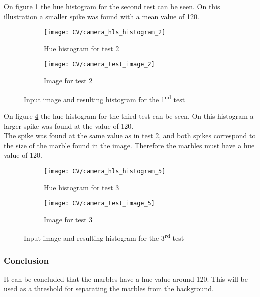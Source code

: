 \documentclass[../Head/Main.tex]{subfiles}
\begin{document}
On figure \ref{fig:hist_test_2} the hue histogram for the second test can be seen. On this illustration a smaller spike was found with a mean value of 120.
\begin{figure}[H]
	\centering
	\begin{subfigure}[b]{0.48\textwidth}
		\centering
		\texttt{[image: CV/camera\_hls\_histogram\_2]}
		\caption{Hue histogram for test 2}
		\label{fig:hist_test_2}
	\end{subfigure}
	\hfill
	\begin{subfigure}[b]{0.5\textwidth}
		\centering
		\texttt{[image: CV/camera\_test\_image\_2]}
		\caption{Image for test 2}
		\label{fig:image_test_2}
	\end{subfigure}
	\caption{Input image and resulting histogram for the 1\textsuperscript{nd} test}
	\label{fig:test_2}
\end{figure}

On figure \ref{fig:hist_test_3} the hue histogram for the third test can be seen. On this histogram a larger spike was found at the value of 120.\\
The spike was found at the same value as in test 2, and both spikes correspond to the size of the marble found in the image. Therefore the marbles must have a hue value of 120.
\begin{figure}[H]
	\centering
	\begin{subfigure}[b]{0.48\textwidth}
		\centering
		\texttt{[image: CV/camera\_hls\_histogram\_5]}
		\caption{Hue histogram for test 3}
		\label{fig:hist_test_3}
	\end{subfigure}
	\hfill
	\begin{subfigure}[b]{0.5\textwidth}
		\centering

		\texttt{[image: CV/camera\_test\_image\_5]}
		\caption{Image for test 3}
		\label{fig:image_test_3}
	\end{subfigure}
	\caption{Input image and resulting histogram for the 3\textsuperscript{rd} test}
	\label{fig:test_3}
\end{figure}


\subsubsection*{Conclusion}

It can be concluded that the marbles have a hue value around 120. This will be used as a threshold for separating the marbles from the background.
\end{document}
